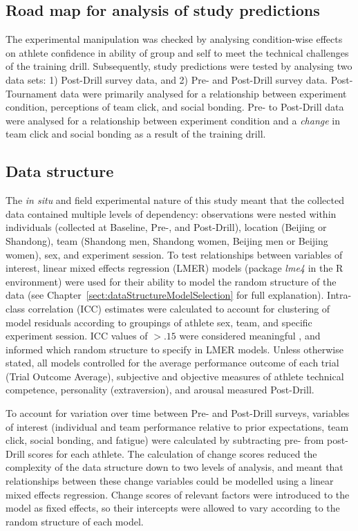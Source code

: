 \begin{CJK}{UTF8}{gbsn}
\subsection{Road map for analysis of study predictions}

The experimental manipulation was checked by analysing condition-wise effects on athlete confidence in ability of group and self to meet the technical challenges of the training drill.  Subsequently, study predictions were tested by analysing two data sets: 1) Post-Drill survey data, and 2) Pre- and Post-Drill survey data.  Post-Tournament data were primarily analysed for a relationship between experiment condition, perceptions of team click, and social bonding.  Pre- to Post-Drill data were analysed for a relationship between experiment condition and a \textit{change} in team click and social bonding as a result of the training drill.




\subsection{Data structure}
The \textit{in situ} and field experimental nature of this study meant that the collected data contained multiple levels of dependency: observations were nested within individuals (collected at Baseline, Pre-, and Post-Drill), location (Beijing or Shandong), team (Shandong men, Shandong women, Beijing men or Beijing women), sex, and experiment session.   To test relationships between variables of interest, linear mixed effects regression (LMER) models (package \textit{lme4} in the R environment) were used for their ability to model the random structure of the data (see Chapter~\ref{sect:dataStructureModelSelection} for full explanation).  Intra-class correlation (ICC) estimates were calculated to account for clustering of model residuals according to groupings of athlete sex, team, and specific experiment session.  ICC values of $>.15$ were considered meaningful \citep{Field2012}, and informed which random structure to specify in LMER models.  Unless otherwise stated, all models controlled for the average performance outcome of each trial (Trial Outcome Average), subjective and objective measures of athlete technical competence, personality (extraversion), and arousal measured Post-Drill.

To account for variation over time between Pre- and Post-Drill surveys, variables of interest (individual and team performance relative to prior expectations, team click, social bonding, and fatigue) were calculated by subtracting pre- from post-Drill scores for each athlete. The calculation of change scores reduced the complexity of the data structure down to two levels of analysis, and meant that relationships between these change variables could be modelled using a linear mixed effects regression. Change scores of relevant factors were introduced to the model as fixed effects, so their intercepts were allowed to vary according to the random structure of each model.


\end{CJK}
